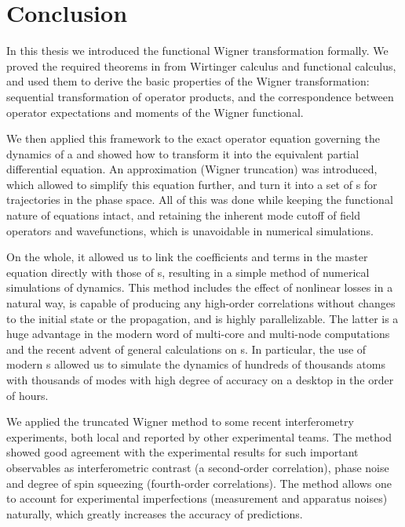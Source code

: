 \chapter{Conclusion}
\label{cha:conclusion}

In this thesis we introduced the functional Wigner transformation formally.
We proved the required theorems in from Wirtinger calculus and functional calculus, and used them to derive the basic properties of the Wigner transformation: sequential transformation of operator products, and the correspondence between operator expectations and moments of the Wigner functional.

We then applied this framework to the exact operator equation governing the dynamics of a  and showed how to transform it into the equivalent partial differential equation.
An approximation (Wigner truncation) was introduced, which allowed to simplify this equation further, and turn it into a set of s for trajectories in the phase space.
All of this was done while keeping the functional nature of equations intact, and retaining the inherent mode cutoff of field operators and wavefunctions, which is unavoidable in numerical simulations.

On the whole, it allowed us to link the coefficients and terms in the master equation directly with those of s, resulting in a simple method of numerical simulations of  dynamics.
This method includes the effect of nonlinear losses in a natural way, is capable of producing any high-order correlations without changes to the initial state or the propagation, and is highly parallelizable.
The latter is a huge advantage in the modern word of multi-core and multi-node computations and the recent advent of general calculations on s.
In particular, the use of modern s allowed us to simulate the dynamics of hundreds of thousands atoms with thousands of modes with high degree of accuracy on a desktop in the order of hours.

We applied the truncated Wigner method to some recent  interferometry experiments, both local and reported by other experimental teams.
The method showed good agreement with the experimental results for such important observables as interferometric contrast (a second-order correlation), phase noise and degree of spin squeezing (fourth-order correlations).
The method allows one to account for experimental imperfections (measurement and apparatus noises) naturally, which greatly increases the accuracy of predictions.

